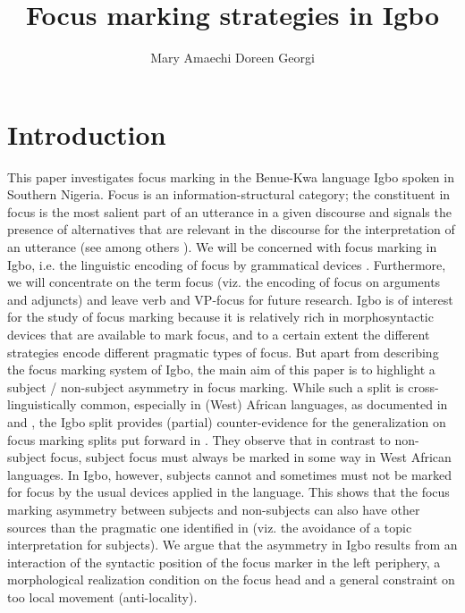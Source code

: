 \documentclass[output=paper,colorlinks,citecolor=brown]{langscibook}
\title{Focus marking strategies in Igbo}
\author{%
 Mary Amaechi \affiliation{University of Potsdam}\lastand
 Doreen Georgi\affiliation{University of Potsdam}
}
\begin{document}
\maketitle 


\section{Introduction}\label{sec:amaechi:1}

This paper investigates focus marking in the Benue-Kwa language Igbo spoken in Southern Nigeria. Focus is an information-structural category; the constituent in focus is the most salient part of an utterance in a given discourse and signals the presence of alternatives that are relevant in the discourse for the interpretation of an utterance (see among others \citealt{Jackendoff1972, Dik1997, Rooth1985, Krifka2008, ZimmermannOnea2011}). We will be concerned with focus marking in Igbo, i.e. the linguistic encoding of focus by grammatical devices \citep{FiedlerEtAl2010}. Furthermore, we will concentrate on the term focus (viz. the encoding of focus on arguments and adjuncts) and leave verb and VP-focus for future research. Igbo is of interest for the study of focus marking because it is relatively rich in  morphosyntactic devices that are available to mark focus, and to a certain extent the different strategies encode different pragmatic types of focus. But apart from describing the focus marking system of Igbo, the main aim of this paper is to highlight a subject / non-subject asymmetry in focus marking. While such a split is cross-linguistically common, especially in (West) African languages, as documented in \citet{FiedlerEtAl2010} and \citet{Kalinowski2015}, the Igbo split provides (partial) counter-evidence for the generalization on focus marking splits put forward in \citet{FiedlerEtAl2010}. They observe that in contrast to non-subject focus, subject focus must always be marked in some way in West African languages. In Igbo, however, subjects cannot and sometimes must not be marked for focus by the usual devices applied in the language. This shows that the focus marking asymmetry between subjects and non-subjects can also have other sources than the pragmatic one identified in \citet{FiedlerEtAl2010} (viz. the avoidance of a topic interpretation for subjects). We argue that the asymmetry in Igbo results from an interaction of the syntactic position of the focus marker in the left periphery, a morphological realization condition on the focus head and a general constraint on too local movement (anti-locality).
\end{document}
